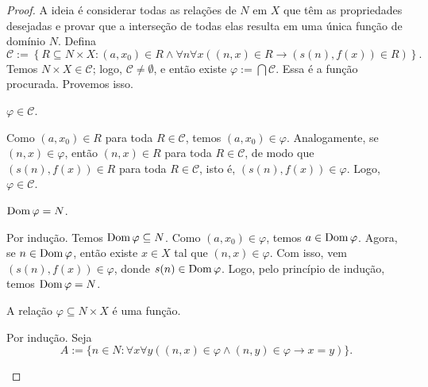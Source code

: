 \begin{proof} 
    A ideia é considerar todas as relações de $N$ em $X$ que têm as propriedades desejadas e provar que a interseção de todas elas resulta em uma única função de domínio $N$. Defina
        \[
            \mathcal{C} := \left\{ R \subseteq N \times X : (a,x_0) \in R \land \forall n \forall x ((n,x) \in R \rightarrow (s(n),f(x)) \in R) \right\}.
        \]
    Temos $N \times X \in \mathcal{C}$; logo, $\mathcal{C} \neq \emptyset$, e então existe $\varphi := \bigcap \mathcal{C}$. Essa é a função procurada. Provemos isso.
        \begin{claim}
           $\varphi \in \mathcal{C}$.
        \end{claim}
        \begin{midproof}
            Como $(a,x_0) \in R$ para toda $R \in \mathcal{C}$, temos $(a,x_0) \in \varphi$. Analogamente, se $(n,x) \in \varphi$, então $(n,x) \in R$ para toda $R \in \mathcal{C}$, de modo que $(s(n),f(x)) \in R$ para toda $R \in \mathcal{C}$, isto é, $(s(n),f(x)) \in \varphi$. Logo, $\varphi \in \mathcal{C}$. \whiteproof
        \end{midproof}
        \begin{claim}
            $\operatorname{Dom} \varphi = N$.
        \end{claim}
        \begin{midproof}
            Por indução. Temos $\operatorname{Dom} \varphi \subseteq N$. Como $(a,x_0) \in \varphi$, temos $a \in \operatorname{Dom} \varphi$. Agora, se $n \in \operatorname{Dom}\varphi$, então existe $x \in X$ tal que $(n,x) \in \varphi$. Com isso, vem $(s(n),f(x)) \in \varphi$, donde $s(n) \in \operatorname{Dom} \varphi$. Logo, pelo princípio de indução, temos $\operatorname{Dom} \varphi = N$. \whiteproof
        \end{midproof}
        \begin{claim}
            A relação $\varphi \subseteq N \times X$ é uma função.
        \end{claim}
        \begin{midproof}
            Por indução. Seja
                \[
                    A := \{n \in N : \forall x \forall y ((n,x) \in \varphi \land (n,y) \in \varphi \rightarrow x=y) \}.
                \]

\end{midproof}
\end{proof}
